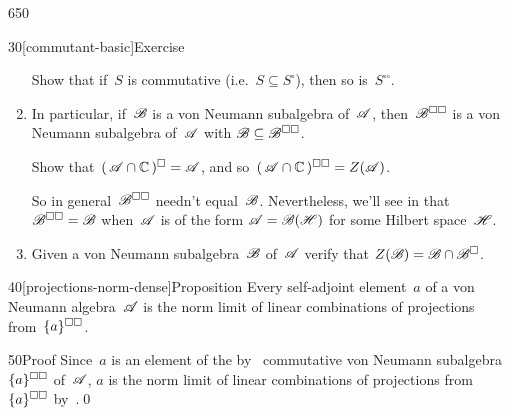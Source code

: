 \begin{parsec}{650}
\begin{point}{30}[commutant-basic]{Exercise}
\begin{enumerate}
Show that if~$S$ is commutative (i.e.~$S\subseteq S^\square$), 
then so is~$S^{\square\square}$.
\item
In particular,
if~$\mathscr{B}$ is a von Neumann subalgebra of~$\mathscr{A}$,
then~$\mathscr{B}^{\square\square}$
is a von Neumann subalgebra of~$\mathscr{A}$
with $\mathscr{B}\subseteq \mathscr{B}^{\square\square}$.

Show that~$(\,\mathscr{A}\cap \mathbb{C}\,)^\square=\mathscr{A}$,
and so~$(\,\mathscr{A}\cap\mathbb{C}\,)^{\square\square} = Z(\mathscr{A})$.

So in general~$\mathscr{B}^{\square\square}$ needn't equal~$\mathscr{B}$.
Nevertheless,
we'll see in  that $\mathscr{B}^{\square\square}=\mathscr{B}$
when~$\mathscr{A}$ is of the form $\mathscr{A}=\mathscr{B}(\mathscr{H})$
for some Hilbert space~$\mathscr{H}$.
\item
Given a von Neumann subalgebra~$\mathscr{B}$
of~$\mathscr{A}$
verify that $Z(\mathscr{B})=\mathscr{B}\cap \mathscr{B}^{\square}$.
\end{enumerate}
\spacingfix%
\end{point}%
\begin{point}{40}[projections-norm-dense]{Proposition}%
Every self-adjoint element~$a$ of a von Neumann algebra~$\mathscr{A}$
is the norm limit
of linear combinations
of projections from~$\smash{\{a\}}^{\square\square}$.
\begin{point}{50}{Proof}%
Since~$a$ is an element
of the by~
commutative von Neumann subalgebra~$\smash{\{a\}}^{\square\square}$
of~$\mathscr{A}$,
$a$ is the norm limit of linear combinations
of projections from~$\smash{\{a\}}^{\square\square}$
by~.\qed
\end{point}
\end{point}
\end{parsec}
